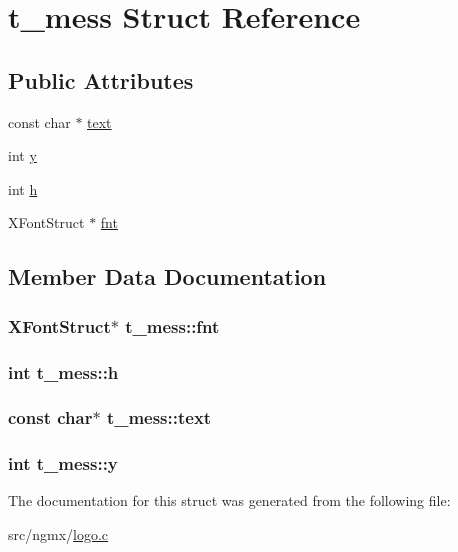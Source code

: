 \hypertarget{structt__mess}{\section{t\-\_\-mess \-Struct \-Reference}
\label{structt__mess}
}
\subsection*{\-Public \-Attributes}
\begin{DoxyCompactItemize}
\item 
const char $\ast$ \hyperlink{structt__mess_a0ba0b8f386d329abeadf117a2b946463}{text}
\item 
int \hyperlink{structt__mess_a3ecac23f53876e4c0e528e5312b71298}{y}
\item 
int \hyperlink{structt__mess_ab89cdcbd2fb74187ddb9e0ccb8ed6a63}{h}
\item 
\-X\-Font\-Struct $\ast$ \hyperlink{structt__mess_a3ec421f7d66cc09f8e9935322b7e2381}{fnt}
\end{DoxyCompactItemize}


\subsection{\-Member \-Data \-Documentation}
\hypertarget{structt__mess_a3ec421f7d66cc09f8e9935322b7e2381}{
\subsubsection[{fnt}]{\setlength{\rightskip}{0pt plus 5cm}\-X\-Font\-Struct$\ast$ {\bf t\-\_\-mess\-::fnt}}}\label{structt__mess_a3ec421f7d66cc09f8e9935322b7e2381}
\hypertarget{structt__mess_ab89cdcbd2fb74187ddb9e0ccb8ed6a63}{
\subsubsection[{h}]{\setlength{\rightskip}{0pt plus 5cm}int {\bf t\-\_\-mess\-::h}}}\label{structt__mess_ab89cdcbd2fb74187ddb9e0ccb8ed6a63}
\hypertarget{structt__mess_a0ba0b8f386d329abeadf117a2b946463}{
\subsubsection[{text}]{\setlength{\rightskip}{0pt plus 5cm}const char$\ast$ {\bf t\-\_\-mess\-::text}}}\label{structt__mess_a0ba0b8f386d329abeadf117a2b946463}
\hypertarget{structt__mess_a3ecac23f53876e4c0e528e5312b71298}{
\subsubsection[{y}]{\setlength{\rightskip}{0pt plus 5cm}int {\bf t\-\_\-mess\-::y}}}\label{structt__mess_a3ecac23f53876e4c0e528e5312b71298}


\-The documentation for this struct was generated from the following file\-:\begin{DoxyCompactItemize}
\item 
src/ngmx/\hyperlink{logo_8c}{logo.\-c}\end{DoxyCompactItemize}
